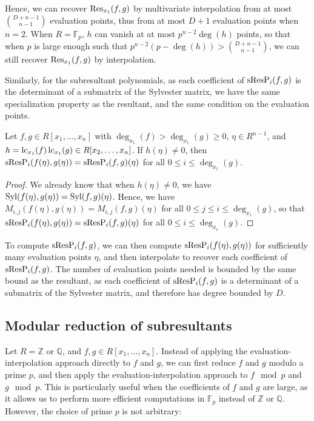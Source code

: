 Hence, we can recover $\operatorname{Res}_{x_1}(f,g)$ by multivariate interpolation from at most $\binom{D + n-1}{n-1}$ evaluation points, thus from at most $D + 1$ evaluation points when $n=2$. When $R=\mathbb{F}_p$, $h$ can vanish at at most $p^{n-2}\deg(h)$ points, so that when $p$ is large enough such that $p^{n-2}(p-\deg(h))>\binom{D + n-1}{n-1}$, we can still recover $\operatorname{Res}_{x_1}(f,g)$ by interpolation.

Similarly, for the subresultant polynomials, as each coefficient of $\operatorname{sResP}_i(f,g)$ is the determinant of a submatrix of the Sylvester matrix, we have the same specialization property as the resultant, and the same condition on the evaluation points.

\begin{proposition}
    Let $f,g\in R[x_1,\dots,x_n]$ with $\deg_{x_1}(f)>\deg_{x_1}(g)\geq 0$, $\eta\in R^{n-1}$, and $h=\operatorname{lc}_{x_1}(f)\operatorname{lc}_{x_1}(g)\in R[x_2,\dots,x_n]$. If $h(\eta)\neq 0$, then $\operatorname{sResP}_i(f(\eta),g(\eta))=\operatorname{sResP}_i(f,g)(\eta)$ for all $0\leq i\leq\deg_{x_1}(g)$.
\end{proposition}

\begin{proof}
    We already know that when $h(\eta)\neq 0$, we have $\operatorname{Syl}(f(\eta),g(\eta))=\operatorname{Syl}(f,g)(\eta)$. Hence, we have $M_{i,j}(f(\eta),g(\eta))=M_{i,j}(f,g)(\eta)$ for all $0\leq j\leq i\leq\deg_{x_1}(g)$, so that $\operatorname{sResP}_i(f(\eta),g(\eta))=\operatorname{sResP}_i(f,g)(\eta)$ for all $0\leq i\leq\deg_{x_1}(g)$.
\end{proof}

To compute $\operatorname{sResP}_i(f,g)$, we can then compute $\operatorname{sResP}_i(f(\eta),g(\eta))$ for sufficiently many evaluation points $\eta$, and then interpolate to recover each coefficient of $\operatorname{sResP}_i(f,g)$. The number of evaluation points needed is bounded by the same bound as the resultant, as each coefficient of $\operatorname{sResP}_i(f,g)$ is a determinant of a submatrix of the Sylvester matrix, and therefore has degree bounded by $D$.

\subsection{Modular reduction of subresultants}

Let $R=\mathbb{Z}$ or $\mathbb{Q}$, and $f,g\in R[x_1,\dots,x_n]$. Instead of applying the evaluation-interpolation approach directly to $f$ and $g$, we can first reduce $f$ and $g$ modulo a prime $p$, and then apply the evaluation-interpolation approach to $f\mod p$ and $g\mod p$. This is particularly useful when the coefficients of $f$ and $g$ are large, as it allows us to perform more efficient computations in $\mathbb{F}_p$ instead of $\mathbb{Z}$ or $\mathbb{Q}$. However, the choice of prime $p$ is not arbitrary:

